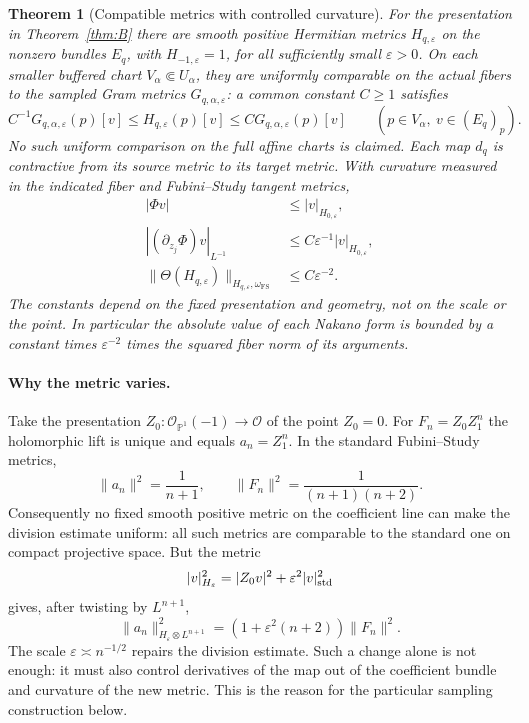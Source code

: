 \documentclass[11pt,reqno]{amsart}
\numberwithin{equation}{section}
\newtheorem{thmD}{Theorem}\renewcommand{\thethmD}{D}
\theoremstyle{definition}
\theoremstyle{remark}
\newcommand{\cO}{\mathcal O}
\newcommand{\FS}{\mathrm{FS}}
\begin{document}
\begin{thmD}[Compatible metrics with controlled curvature]\label{thm:D}
For the presentation in Theorem~\ref{thm:B} there are smooth positive
Hermitian metrics $H_{q,\varepsilon}$ on the nonzero bundles $E_q$, with
$H_{-1,\varepsilon}=1$, for all sufficiently small $\varepsilon>0$.
On each smaller buffered chart $V_\alpha\Subset U_\alpha$,
they are uniformly comparable on the actual fibers to the sampled
Gram metrics $G_{q,\alpha,\varepsilon}$: a common constant $C\geq1$
satisfies
\[
 C^{-1}G_{q,\alpha,\varepsilon}(p)[v]
 \leq H_{q,\varepsilon}(p)[v]
 \leq C G_{q,\alpha,\varepsilon}(p)[v]
 \qquad(p\in V_\alpha,\ v\in(E_q)_p).
\]
No such uniform comparison on the full affine charts is claimed.
Each map $d_q$ is contractive from its source metric to its target metric.
With curvature measured in the indicated fiber and Fubini--Study tangent metrics,
\begin{align}
 |\Phi v|&\le |v|_{H_{0,\varepsilon}},\label{eq:geo-contract}\\
 |(\partial_{z_j}\Phi)v|_{L^{-1}}
 &\le C\varepsilon^{-1}|v|_{H_{0,\varepsilon}},\label{eq:geo-differentiate}\\
 \|\Theta(H_{q,\varepsilon})\|_{H_{q,\varepsilon},\omega_{\FS}}
 &\le C\varepsilon^{-2}.\label{eq:geo-curvature}
\end{align}
The constants depend on the fixed presentation and geometry, not on the
scale or the point. In particular the absolute value of each Nakano form
is bounded by a constant times $\varepsilon^{-2}$ times the squared
fiber norm of its arguments.
\end{thmD}

\paragraph{Why the metric varies.}
Take the presentation $Z_0:\cO_{\mathbb P^1}(-1)\to\cO$ of the point
$Z_0=0$. For $F_n=Z_0Z_1^n$ the holomorphic lift is unique and equals
$a_n=Z_1^n$. In the standard Fubini--Study metrics,
\[
 \|a_n\|^2=\frac1{n+1},\qquad
 \|F_n\|^2=\frac1{(n+1)(n+2)}.
\]
Consequently no fixed smooth positive metric on the coefficient line can
make the division estimate uniform: all such metrics are comparable to
the standard one on compact projective space. But the metric
\[
 |v|_{H_\varepsilon}^2=|Z_0v|^2+\varepsilon^2|v|_{\rm std}^2
\]
gives, after twisting by $L^{n+1}$,
\[
 \|a_n\|_{H_\varepsilon\otimes L^{n+1}}^2
 = (1+\varepsilon^2(n+2))\|F_n\|^2.
\]
The scale $\varepsilon\asymp n^{-1/2}$ repairs the division estimate.
Such a change alone is not enough: it must also control derivatives of
the map out of the coefficient bundle and curvature of the new metric.
This is the reason for the particular sampling construction below.
\end{document}
